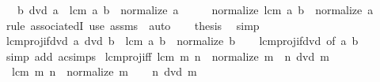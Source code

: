 \begin{isabellebody}
\ \ \ {\isachardoublequoteopen}b\ dvd\ a{\isachardoublequoteclose}\ \ {\isachardoublequoteopen}lcm\ a\ b\ {\isacharequal}{\kern0pt}\ normalize\ a{\isachardoublequoteclose}\isanewline
%
\isadelimproof
%
\endisadelimproof
%
\isatagproof
{}\isamarkupfalse%
\ {\isacharminus}{\kern0pt}\isanewline
\ \ \isamarkupfalse%
\ {\isachardoublequoteopen}normalize\ {\isacharparenleft}{\kern0pt}lcm\ a\ b{\isacharparenright}{\kern0pt}\ {\isacharequal}{\kern0pt}\ normalize\ a{\isachardoublequoteclose}\isanewline
\ \ \ \ \isamarkupfalse%
\ {\isacharparenleft}{\kern0pt}rule\ associatedI{\isacharparenright}{\kern0pt}\ {\isacharparenleft}{\kern0pt}use\ assms\ \ auto{\isacharparenright}{\kern0pt}\isanewline
\ \ \isamarkupfalse%
\ {\isacharquery}{\kern0pt}thesis\ \isamarkupfalse%
\ simp\isanewline
{}\isamarkupfalse%
%
\endisatagproof
{\isafoldproof}%
%
\isadelimproof
\isanewline
%
\endisadelimproof
\isanewline
{}\isamarkupfalse%
\ lcm{\isacharunderscore}{\kern0pt}proj{}{\isacharunderscore}{\kern0pt}if{\isacharunderscore}{\kern0pt}dvd{\isacharcolon}{\kern0pt}\ {\isachardoublequoteopen}a\ dvd\ b\ {\isasymLongrightarrow}\ lcm\ a\ b\ {\isacharequal}{\kern0pt}\ normalize\ b{\isachardoublequoteclose}\isanewline
%
\isadelimproof
\ \ %
\endisadelimproof
%
\isatagproof
{}\isamarkupfalse%
\ lcm{\isacharunderscore}{\kern0pt}proj{}{\isacharunderscore}{\kern0pt}if{\isacharunderscore}{\kern0pt}dvd\ {\isacharbrackleft}{\kern0pt}of\ a\ b{\isacharbrackright}{\kern0pt}\ \isamarkupfalse%
\ {\isacharparenleft}{\kern0pt}simp\ add{\isacharcolon}{\kern0pt}\ ac{\isacharunderscore}{\kern0pt}simps{\isacharparenright}{\kern0pt}%
\endisatagproof
{\isafoldproof}%
%
\isadelimproof
\isanewline
%
\endisadelimproof
\isanewline
{}\isamarkupfalse%
\ lcm{\isacharunderscore}{\kern0pt}proj{}{\isacharunderscore}{\kern0pt}iff{\isacharcolon}{\kern0pt}\ {\isachardoublequoteopen}lcm\ m\ n\ {\isacharequal}{\kern0pt}\ normalize\ m\ {\isasymlongleftrightarrow}\ n\ dvd\ m{\isachardoublequoteclose}\isanewline
%
\isadelimproof
%
\endisadelimproof
%
\isatagproof
{}\isamarkupfalse%
\isanewline
\ \ \isamarkupfalse%
\ {\isacharasterisk}{\kern0pt}{\isacharcolon}{\kern0pt}\ {\isachardoublequoteopen}lcm\ m\ n\ {\isacharequal}{\kern0pt}\ normalize\ m{\isachardoublequoteclose}\isanewline
\ \ \isamarkupfalse%
\ {\isachardoublequoteopen}n\ dvd\ m{\isachardoublequoteclose}\isanewline

\end{isabellebody}
